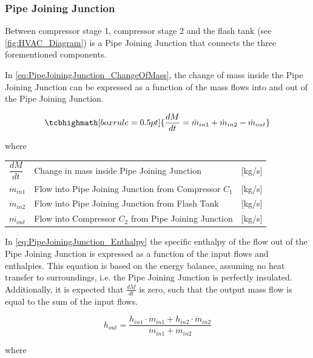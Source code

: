 \subsubsection{Pipe Joining Junction}
Between compressor stage 1, compressor stage 2 and the flash tank (see \cref{fig:HVAC_Diagram}) is a Pipe Joining Junction that connects the three forementioned components.

In \cref{eq:PipeJoiningJunction_ChangeOfMass}, the change of mass inside the Pipe Joining Junction can be expressed as a function of the mass flows into and out of the Pipe Joining Junction.


\begin{equation}
	\tcbhighmath[boxrule = 0.5pt]{ \frac{dM}{dt} = \dot{m}_{in1} + \dot{m}_{in2} - \dot{m}_{out} }       \label{eq:PipeJoiningJunction_ChangeOfMass}   
\end{equation}

where

\begin{center}
	\begin{tabular}{l p{8cm} l}
		$\dfrac{dM}{dt}$ & Change in mass inside Pipe Joining Junction             & [\si{kg}/\si{s}] \\
		$\dot{m}_{in1}$  & Flow into Pipe Joining Junction from Compressor $ C_1 $ & [\si{kg}/\si{s}] \\
		$\dot{m}_{in2}$  & Flow into Pipe Joining Junction from Flash Tank         & [\si{kg}/\si{s}] \\
		$\dot{m_{out}}$  & Flow into Compressor $ C_2 $ from Pipe Joining Junction & [\si{kg}/\si{s}]
	\end{tabular}
\end{center}

In \cref{eq:PipeJoiningJunction_Enthalpy} the specific enthalpy of the flow out of the Pipe Joining Junction is expressed as a function of the input flows and enthalpies. This equation is based on the energy balance, assuming no heat transfer to surroundings, i.e. the Pipe Joining Junction is perfectly insulated. Additionally, it is expected that $\frac{dM}{dt}$ is zero, such that the output mass flow is equal to the sum of the input flows.

\begin{equation} \label{eq:PipeJoiningJunction_Enthalpy}
	h_{out} = \frac{h_{in1} \cdot \dot{m}_{in1} + h_{in2} \cdot \dot{m}_{in2}}{ \dot{m}_{in1} + \dot{m}_{in2} }
\end{equation}

where

